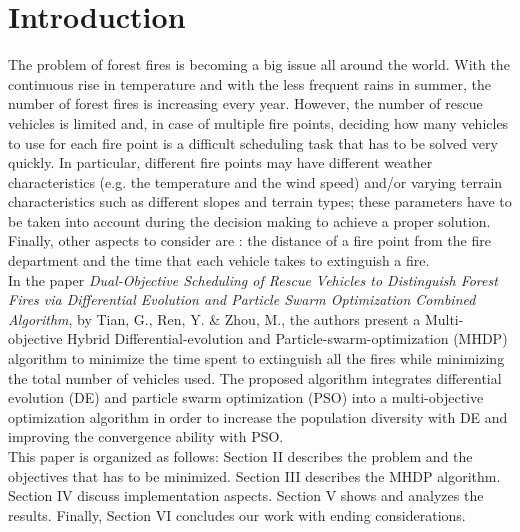 \section{Introduction}
The problem of forest fires is becoming a big issue all around the world. With the continuous rise in temperature and with the less frequent rains in summer, the number of forest fires is increasing every year. However, the number of rescue vehicles is limited and, in case of multiple fire points, deciding how many vehicles to use for each fire point is a difficult scheduling task that has to be solved very quickly. 
In particular, different fire points may have different weather characteristics (e.g. the temperature and the wind speed) and/or varying terrain characteristics such as different slopes and terrain types; these parameters have to be taken into account during the decision making to achieve a proper solution.
Finally, other aspects to consider are : the distance of a fire point from the fire department and the time that each vehicle takes to extinguish a fire.\\
In the paper \textit{Dual-Objective Scheduling of Rescue Vehicles to Distinguish Forest Fires via Differential Evolution and Particle Swarm Optimization Combined Algorithm}\cite{fire_distinguish}, by Tian, G., Ren, Y. \& Zhou, M., the authors present a  Multi-objective Hybrid Differential-evolution and Particle-swarm-optimization (MHDP) algorithm to minimize the time spent to extinguish all the fires while minimizing the total number of vehicles used. The proposed algorithm integrates differential evolution (DE) and particle swarm optimization (PSO) into a multi-objective optimization algorithm in order to increase the population diversity with DE and improving the convergence ability with PSO.\\
This paper is organized as follows: Section II describes the problem and the objectives that has to be minimized. Section III describes the MHDP algorithm. Section IV discuss implementation aspects. Section V shows and analyzes the results.
Finally, Section VI concludes our work with ending considerations.
